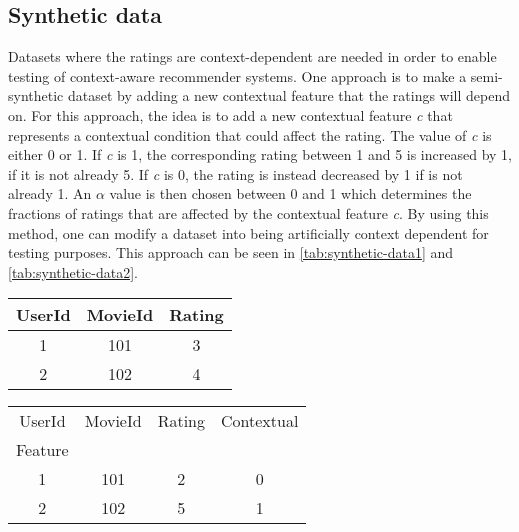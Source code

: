 \subsection{Synthetic data}
Datasets where the ratings are context-dependent are needed in order to enable testing of context-aware recommender systems.
One approach is to make a semi-synthetic dataset by adding a new contextual feature that the ratings will depend on\cite{baltrunasContextItemSplit}.
For this approach, the idea is to add a new contextual feature \textit{c} that represents a contextual condition that could affect the rating.
The value of \textit{c} is either 0 or 1. 
If \textit{c} is 1, the corresponding rating between 1 and 5 is increased by 1, if it is not already 5.
If \textit{c} is 0, the rating is instead decreased by 1 if is not already 1.
An $\alpha$ value is then chosen between 0 and 1 which determines the fractions of ratings that are affected by the contextual feature \textit{c}.
By using this method, one can modify a dataset into being artificially context dependent for testing purposes.
This approach can be seen in \cref{tab:synthetic-data1} and \cref{tab:synthetic-data2}.
\begin{table*}[hbt!]
    \centering
    \begin{tabular}{|c|c|c|}
    \hline
    UserId & MovieId & Rating \\ [0.5ex] 
    \hline\hline
    1 & 101 & 3 \\
    \hline
    2 & 102 & 4 \\
    \hline
    \end{tabular}
    \caption{Ratings table without the contextual feature.}
    \label{tab:synthetic-data1}
\end{table*}
\begin{table*}[hbt!]
    \centering
    \begin{tabular}{|c|c|c|c|} 
    \hline
    UserId & MovieId & Rating & Contextual\\Feature \\ [0.5ex] 
    \hline\hline
    1 & 101 & 2 & 0 \\
    \hline
    2 & 102 & 5 & 1 \\
    \hline
    \end{tabular}
    \caption{Ratings table with the contextual feature.}
    \label{tab:synthetic-data2}
\end{table*}
